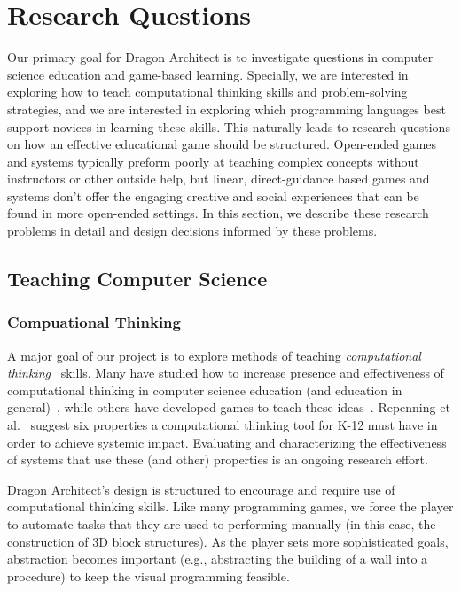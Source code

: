 \documentclass{sig-alternate}
\newcommand{\gametitle}{{Dragon Architect}}
\begin{document}
\section{Research Questions}
\label{sec:research}

Our primary goal for \gametitle{} is to investigate questions in computer science education and game-based learning. 
Specially, we are interested in exploring how to teach computational thinking skills and problem-solving strategies, and we are interested in exploring which programming languages best support novices in learning these skills. 
This naturally leads to research questions on how an effective educational game should be structured.
Open-ended games and systems typically preform poorly at teaching complex concepts without instructors or other outside help, but linear, direct-guidance based games and systems don't offer the engaging creative and social experiences that can be found in more open-ended settings.
In this section, we describe these research problems in detail and design decisions informed by these problems.

\subsection{Teaching Computer Science}

\subsubsection{Compuational Thinking}

A major goal of our project is to explore methods of teaching \emph{computational thinking}~\cite{wing2008computational} skills.
Many have studied how to increase presence and effectiveness of computational thinking in computer science education (and education in general)~\cite{barr2011bringing, lye2014review},
while others have developed games to teach these ideas~\cite{weintrop2013robobuilder, kazimoglu2012serious}. 
Repenning et al.~\cite{repenning2010scalable} suggest six properties a computational thinking tool for K-12 must have in order to achieve systemic impact. 
Evaluating and characterizing the effectiveness of systems that use these (and other) properties is an ongoing research effort.

\gametitle{}'s design is structured to encourage and require use of computational thinking skills.
Like many programming games, we force the player to automate tasks that they are used to performing manually (in this case, the construction of 3D block structures).
As the player sets more sophisticated goals, abstraction becomes important (e.g., abstracting the building of a wall into a procedure) to keep the visual programming feasible. 
\end{document}
